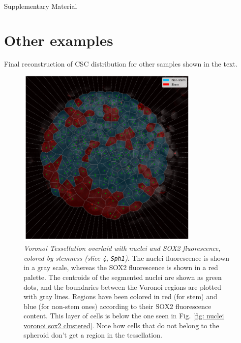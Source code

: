 \setcounter{figure}{0}   
\setcounter{page}{1}   
\setcounter{section}{0} 
\renewcommand\thefigure{S\arabic{figure}}



{\Huge Supplementary Material}

\section{Other examples}

Final reconstruction of CSC distribution for other samples shown in the text.

\begin{figure}[h!]
    \centering
    \includegraphics[width=0.8\textwidth]{images/sph1_slice4/nuclei_voronoi_in_sph_only_sox2_clustered_tails_cut_in_sph_with_artificial_boundary_cropped.png}
    \caption{\emph{Voronoi Tessellation overlaid with nuclei and SOX2 fluorescence, colored by stemness (slice 4, \lstinline{Sph1}).} The nuclei fluorescence is shown in a gray scale, whereas the SOX2 fluorescence is shown in a red palette. The centroids of the segmented nuclei are shown as green dots, and the boundaries between the Voronoi regions are plotted with gray lines. Regions have been colored in red (for stem) and blue (for non-stem ones) according to their SOX2 fluorescence content. This layer of cells is below the one seen in Fig. \ref{fig: nuclei voronoi sox2 clustered}. Note how cells that do not belong to the spheroid don't get a region in the tessellation.}
    \label{fig: nuclei voronoi sox2 clustered slice 4}
\end{figure}


